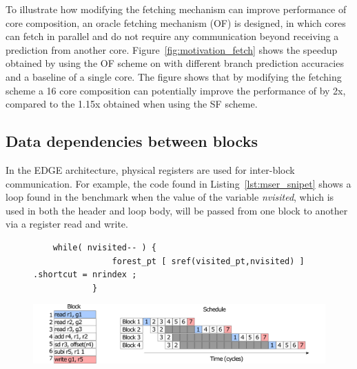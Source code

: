 To illustrate how modifying the fetching mechanism can improve performance of core composition, an oracle fetching mechanism (OF) is designed, in which cores can fetch in parallel and do not require any communication beyond receiving a prediction from another core.
Figure~\ref{fig:motivation_fetch} shows the speedup obtained by using the OF scheme on  with different branch prediction accuracies and a baseline of a single core.
The figure shows that by modifying the fetching scheme a 16 core composition can potentially improve the performance of  by 2x, compared to the 1.15x obtained when using the SF scheme.

\subsection{Data dependencies between blocks}

In the EDGE architecture, physical registers are used for inter-block communication.
For example, the code found in Listing~\ref{lst:mser_snipet} shows a loop found in the  benchmark when the value of the variable \textit{nvisited}, which is used in both the header and loop body, will be passed from one block to another via a register read and write.


\begin{figure}[t]
\lstset{language=C,numbersep=4pt}
\begin{center}
\begin{lstlisting}
	while( nvisited-- ) {
				forest_pt [ sref(visited_pt,nvisited) ] .shortcut = nrindex ;
			}
\end{lstlisting}
\end{center}
\vspace{-2em}
\label{lst:mser_snipet}
    \centering
    \includegraphics[width=1\textwidth]{chapter3/graphics/mser_ex.pdf}
    \label{fig:mser_nvsited}
	\vspace{1em}
\end{figure}

